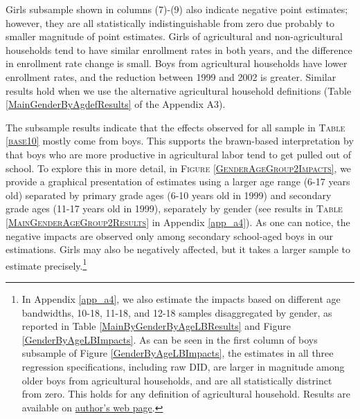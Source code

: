 \documentclass[12pt,letterpaper]{article}\usepackage[margin=1in]{geometry}
\newcommand{\0}{\ensuremath{\mbox{\boldmath $0$}}}
\begin{document}
Girls subsample shown in columns (7)-(9) also indicate negative point estimates; however, they are all statistically indistinguishable from zero due probably to smaller magnitude of point estimates. Girls of agricultural and non-agricultural households tend to have similar enrollment rates in both years, and the difference in enrollment rate change is small. Boys from agricultural households have lower enrollment rates, and the reduction between 1999 and 2002 is greater. Similar results hold when we use the alternative agricultural household definitions (\textsf{\small Table \ref{MainGenderByAgdefResults}} of the Appendix A3). 

The subsample results indicate that the effects observed for all sample in \textsc{\small Table \ref{base10}} mostly come from boys. This supports the brawn-based interpretation by \cite{PittRosenzweigHassan2010} that boys who are more productive in agricultural labor tend to get pulled out of school. To explore this in more detail, in \textsc{\small Figure \ref{GenderAgeGroup2Impacts}}, we provide a graphical presentation of estimates using a larger age range (6-17 years old) separated by primary grade ages (6-10 years old in 1999) and secondary grade ages (11-17 years old in 1999), separately by gender (see results in \textsc{\small Table \ref{MainGenderAgeGroup2Results}} in Appendix \ref{app_a4}). As one can notice, the negative impacts are observed only among secondary school-aged boys in our estimations. Girls may also be negatively affected, but it takes a larger sample to estimate precisely.\footnote{In Appendix \ref{app_a4}, we also estimate the impacts based on different age bandwidths, 10-18, 11-18, and 12-18 samples disaggregated by gender, as reported in \textsf{\small Table \ref{MainByGenderByAgeLBResults}} and \textsf{\small Figure \ref{GenderByAgeLBImpacts}}. As can be seen in the first column of boys subsample of \textsf{\small Figure \ref{GenderByAgeLBImpacts}}, the estimates in all three regression specifications, including raw DID, are larger in magnitude among older boys from agricultural households, and are all statistically distrinct from zero. This holds for any definition of agricultural household. Results are available on \href{https://seiroito.github.io/Ramadan/program/RamadanEstimationJDE_Tufte.html}{author's web page}. }
\end{document}
